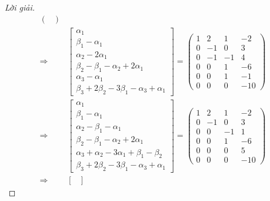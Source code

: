 \documentclass[class=linearalgebra,crop=false]{standalone}
\begin{document}
\begin{proof}[Lời giải]
\begin{align*}
\begin{pmatrix}
        \end{pmatrix} \\
        \Longrightarrow&
        \begin{bmatrix}
            \alpha_{1} \\
            \beta_{1} - \alpha_{1} \\
            \alpha_{2} - 2\alpha_{1} \\
            \beta_{2} - \beta_{1} - \alpha_{2} + 2\alpha_{1} \\
            \alpha_{3} - \alpha_{1} \\
            \beta_{3} + 2\beta_{2} - 3\beta_{1} - \alpha_{3} + \alpha_{1}
        \end{bmatrix}=
        \begin{pmatrix}
            1 & 2 & 1 & -2 \\
            0 & -1 & 0 & 3 \\
            0 & -1 & -1 & 4 \\
            0 & 0 & 1 & -6 \\
            0 & 0 & 1 & -1 \\
            0 & 0 & 0 & -10
        \end{pmatrix} \\
        \Longrightarrow&
        \begin{bmatrix}
            \alpha_{1} \\
            \beta_{1} - \alpha_{1} \\
            \alpha_{2} - \beta_{1} - \alpha_{1} \\
            \beta_{2} - \beta_{1} - \alpha_{2} + 2\alpha_{1} \\
            \alpha_{3} + \alpha_{2} - 3\alpha_{1} + \beta_{1} - \beta_{2} \\
            \beta_{3} + 2\beta_{2} - 3\beta_{1} - \alpha_{3} + \alpha_{1}
        \end{bmatrix}=
        \begin{pmatrix}
            1 & 2 & 1 & -2 \\
            0 & -1 & 0 & 3 \\
            0 & 0 & -1 & 1 \\
            0 & 0 & 1 & -6 \\
            0 & 0 & 0 & 5 \\
            0 & 0 & 0 & -10
        \end{pmatrix} \\
        \Longrightarrow&
        \begin{bmatrix}

\end{bmatrix}
\end{align*}
\end{proof}
\end{document}

